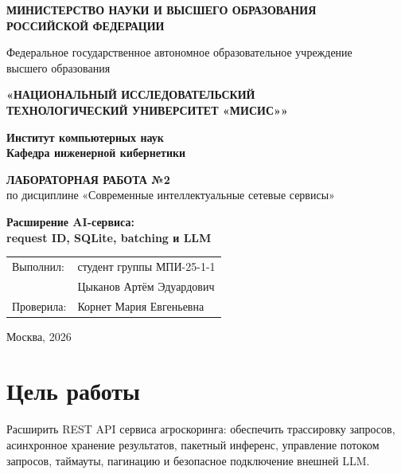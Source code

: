 \documentclass[12pt,a4paper]{article}
\begin{document}
\begin{titlepage}
  \begin{center}
    \textbf{МИНИСТЕРСТВО НАУКИ И ВЫСШЕГО ОБРАЗОВАНИЯ\\РОССИЙСКОЙ ФЕДЕРАЦИИ}
    \vspace{0.5cm}

    Федеральное государственное автономное образовательное учреждение\\
    высшего образования
    \vspace{0.3cm}

    \textbf{«НАЦИОНАЛЬНЫЙ ИССЛЕДОВАТЕЛЬСКИЙ\\
    ТЕХНОЛОГИЧЕСКИЙ УНИВЕРСИТЕТ «МИСИС»»}
    \vspace{1.5cm}

    \textbf{Институт компьютерных наук}\\[0.3cm]
    \textbf{Кафедра инженерной кибернетики}
    \vspace{1.7cm}

    \textbf{ЛАБОРАТОРНАЯ РАБОТА №2}\\[0.4cm]
    по дисциплине «Современные интеллектуальные сетевые сервисы»
    \vspace{1.5cm}

    {\Large\bfseries Расширение AI-сервиса:\\
    request ID, SQLite, batching и LLM}
  \end{center}
  \vfill
  \begin{flushright}
    \begin{tabular}{@{}ll@{}}
      Выполнил: & студент группы МПИ-25-1-1 \\
                & Цыканов Артём Эдуардович \\[0.5cm]
      Проверила: & Корнет Мария Евгеньевна
    \end{tabular}
  \end{flushright}
  \vfill
  \begin{center}Москва, 2026\end{center}
\end{titlepage}

\tableofcontents
\newpage

\section{Цель работы}

Расширить REST API сервиса агроскоринга: обеспечить трассировку запросов,
асинхронное хранение результатов, пакетный инференс, управление потоком
запросов, таймауты, пагинацию и безопасное подключение внешней LLM.
\end{document}
